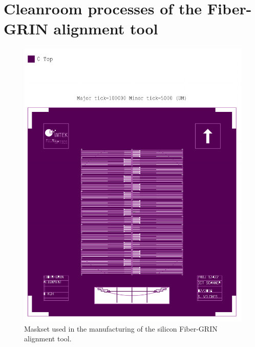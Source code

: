 \section{Cleanroom processes of the Fiber-GRIN alignment tool}
\begin{figure}[h!]\centering \includegraphics[width=12cm]{appendix/KOH.pdf}
      \caption{Maskset used in the manufacturing of the silicon Fiber-GRIN alignment tool.}
\end{figure}



\clearpage
